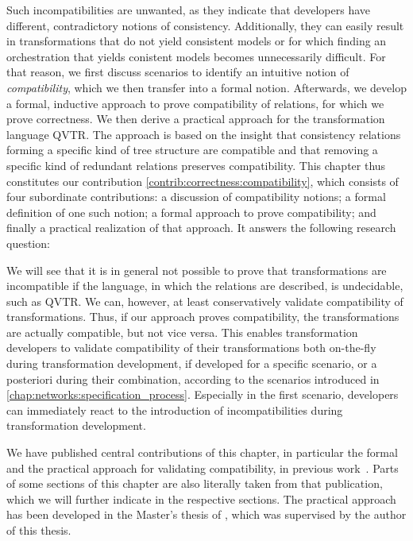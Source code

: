 Such incompatibilities are unwanted, as they indicate that developers have different, contradictory notions of consistency.
Additionally, they can easily result in transformations that do not yield consistent models or for which finding an orchestration that yields conistent models becomes unnecessarily difficult.
For that reason, we first discuss scenarios to identify an intuitive notion of \emph{compatibility}, which we then transfer into a formal notion.
Afterwards, we develop a formal, inductive approach to prove compatibility of relations, for which we prove correctness.
We then derive a practical approach for the transformation language \gls{QVTR}.
The approach is based on the insight that consistency relations forming a specific kind of tree structure are compatible and that removing a specific kind of redundant relations preserves compatibility.
This chapter thus constitutes our contribution \autoref{contrib:correctness:compatibility}, which consists of four subordinate contributions: a discussion of compatibility notions; a formal definition of one such notion; a formal approach to prove compatibility; and finally a practical realization of that approach.
It answers the following research question:


We will see that it is in general not possible to prove that transformations are incompatible if the language, in which the relations are described, is undecidable, such as \gls{QVTR}.
We can, however, at least conservatively validate compatibility of transformations.
Thus, if our approach proves compatibility, the transformations are actually compatible, but not vice versa.
This enables transformation developers to validate compatibility of their transformations both on-the-fly during transformation development, if developed for a specific scenario, or a posteriori during their combination, according to the scenarios introduced in \autoref{chap:networks:specification_process}.
Especially in the first scenario, developers can immediately react to the introduction of incompatibilities during transformation development.

We have published central contributions of this chapter, in particular the formal and the practical approach for validating compatibility, in previous work~.
Parts of some sections of this chapter are also literally taken from that publication, which we will further indicate in the respective sections.
The practical approach has been developed in the Master's thesis of \textcite{pepin2019ma}, which was supervised by the author of this thesis.





